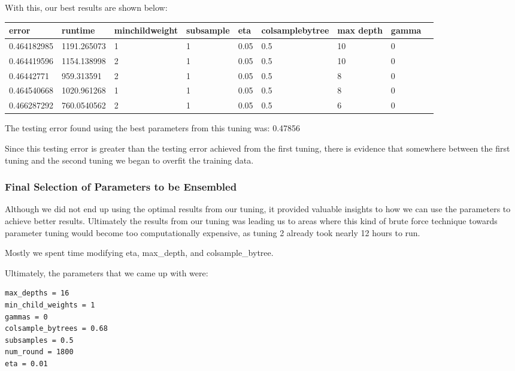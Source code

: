 \documentclass[twoside,11pt]{article}
\theoremstyle{definition}
\begin{document}
      With this, our best results are shown below:

      \begin{center}
          \begin{tabular}{ | l | l | l | l | l | l | l | l | p{5cm} |}
          \hline
          error & runtime & minchildweight & subsample & eta & colsamplebytree & max depth & gamma \\ \hline
          0.464182985 & 1191.265073 & 1 & 1 & 0.05 & 0.5 & 10 & 0 \\ \hline
          0.464419596 & 1154.138998 & 2 & 1 & 0.05 & 0.5 & 10 & 0 \\ \hline
          0.46442771 & 959.313591 & 2 & 1 & 0.05 & 0.5 & 8 & 0 \\ \hline
          0.464540668 & 1020.961268 & 1 & 1 & 0.05 & 0.5 & 8 & 0 \\ \hline
          0.466287292 & 760.0540562 & 2 & 1 & 0.05 & 0.5 & 6 & 0 \\ \hline
          \end{tabular}
      \end{center}

      The testing error found using the best parameters from this tuning was: 0.47856

      Since this testing error is greater than the testing error achieved from the first tuning, there is evidence that somewhere between the first tuning and the second tuning we began to overfit the training data.

    \subsubsection{Final Selection of Parameters to be Ensembled}

      Although we did not end up using the optimal results from our tuning, it provided valuable insights to how we can use the parameters to achieve better results. Ultimately the results from our tuning was leading us to areas where this kind of brute force technique towards parameter tuning would become too computationally expensive, as tuning 2 already took nearly 12 hours to run.

      Mostly we spent time modifying eta, max\_depth, and colsample\_bytree.

      Ultimately, the parameters that we came up with were:
      \begin{lstlisting}
max_depths = 16
min_child_weights = 1
gammas = 0
colsample_bytrees = 0.68
subsamples = 0.5
num_round = 1800
eta = 0.01
      \end{lstlisting}
\end{document}
